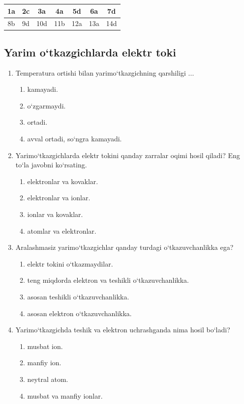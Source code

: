 \begin{table}[!ht]
\centering
\begin{tabular}{|c|c|c|c|c|c|c|}
\hline
1a & 2c & 3a & 4a & 5d & 6a & 7d \\ \hline
8b & 9d & 10d & 11b & 12a & 13a & 14d \\ \hline
\end{tabular}
\end{table}


\subsection*{Yarim o`tkazgichlarda elektr toki}


\begin{enumerate}

\item Temperatura ortishi bilan yarimo‘tkazgichning qarshiligi ...
\begin{enumerate}[label=\Alph*)]
\item kamayadi.
\item o‘zgarmaydi.
\item ortadi.
\item avval ortadi, so‘ngra kamayadi.
\end{enumerate}

\item Yarimo‘tkazgichlarda elektr tokini qanday zarralar oqimi hosil qiladi? Eng to‘la javobni ko‘rsating.
\begin{enumerate}[label=\Alph*)]
\item elektronlar va kovaklar.
\item elektronlar va ionlar.
\item ionlar va kovaklar.
\item atomlar va elektronlar.
\end{enumerate}

\item Aralashmasiz yarimo‘tkazgichlar qanday turdagi o‘tkazuvchanlikka ega?
\begin{enumerate}[label=\Alph*)]
\item elektr tokini o‘tkazmaydilar.
\item teng miqdorda elektron va teshikli o‘tkazuvchanlikka.
\item asosan teshikli o‘tkazuvchanlikka.
\item asosan elektron o‘tkazuvchanlikka.
\end{enumerate}

\item Yarimo‘tkazgichda teshik va elektron uchrashganda nima hosil bo‘ladi?
\begin{enumerate}[label=\Alph*)]
\item musbat ion.
\item manfiy ion.
\item neytral atom.
\item musbat va manfiy ionlar.
\end{enumerate}


\end{enumerate}
